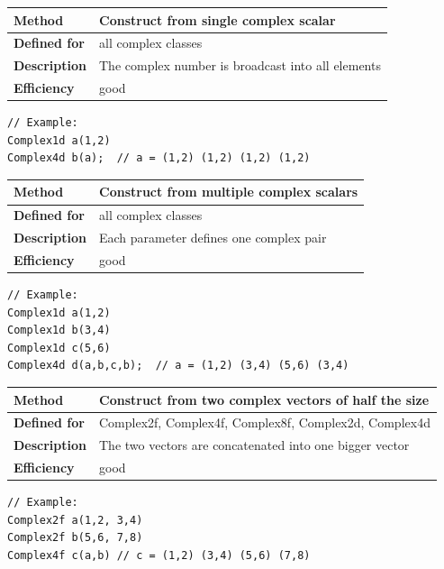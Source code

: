 \documentclass[11pt,a4paper,oneside,openright]{report}
\newcommand{\vspacesmall}{\vspace{3mm}}
\newcommand{\vspacebig}{\vspace{6mm}}
\begin{document}
\begin{tabular}{|p{25mm}|p{100mm}|}
\hline
\bfseries Method & Construct from single complex scalar \\ \hline
\bfseries Defined for & all complex classes \\ \hline
\bfseries Description & The complex number is broadcast into all elements \\ \hline
\bfseries Efficiency & good \\ \hline
\end{tabular}
\vspacesmall

\begin{lstlisting}[frame=none]
// Example:
Complex1d a(1,2)
Complex4d b(a);  // a = (1,2) (1,2) (1,2) (1,2)
\end{lstlisting}
\vspacebig


\begin{tabular}{|p{25mm}|p{100mm}|}
\hline
\bfseries Method & Construct from multiple complex scalars \\ \hline
\bfseries Defined for & all complex classes \\ \hline
\bfseries Description & Each parameter defines one complex pair \\ \hline
\bfseries Efficiency & good \\ \hline
\end{tabular}
\vspacesmall

\begin{lstlisting}[frame=none]
// Example:
Complex1d a(1,2)
Complex1d b(3,4)
Complex1d c(5,6)
Complex4d d(a,b,c,b);  // a = (1,2) (3,4) (5,6) (3,4)
\end{lstlisting}
\vspacebig


\begin{tabular}{|p{25mm}|p{100mm}|}
\hline
\bfseries Method & Construct from two complex vectors of half the size \\ \hline
\bfseries Defined for & Complex2f, Complex4f, Complex8f, Complex2d, Complex4d \\ \hline
\bfseries Description & The two vectors are concatenated into one bigger vector \\ \hline
\bfseries Efficiency & good \\ \hline
\end{tabular}
\vspacesmall

\begin{lstlisting}[frame=none]
// Example:
Complex2f a(1,2, 3,4)
Complex2f b(5,6, 7,8)
Complex4f c(a,b) // c = (1,2) (3,4) (5,6) (7,8)
\end{lstlisting}
\vspacebig
\end{document}
